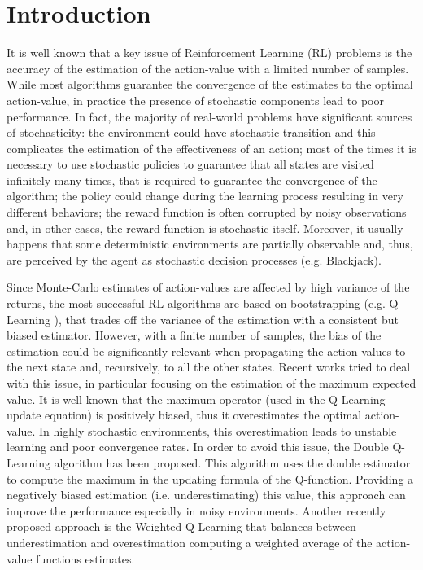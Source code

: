 \documentclass[conference]{IEEEtran}
\begin{document}
\section{Introduction}
It is well known that a key issue of Reinforcement Learning (RL) problems is the accuracy of the estimation of the action-value with a limited number of samples. While most algorithms guarantee the convergence of the estimates to the optimal action-value, in practice the presence of stochastic components lead to poor performance. In fact, the majority of real-world problems have significant sources of stochasticity: the environment could have stochastic transition and this complicates the estimation of the effectiveness of an action; most of the times it is necessary to use stochastic policies to guarantee that all states are visited infinitely many times, that is required to guarantee the convergence of the algorithm; the policy could change during the learning process resulting in very different behaviors; the reward function is often corrupted by noisy observations and, in other cases, the reward function is stochastic itself. Moreover, it usually happens that some deterministic environments are partially observable and, thus, are perceived by the agent as stochastic decision processes (e.g. Blackjack).

Since Monte-Carlo estimates of action-values are affected by high variance of the returns, the most successful RL algorithms are based on bootstrapping (e.g. Q-Learning \cite{watkins1992q}), that trades off the variance of the estimation with a consistent but biased estimator. However, with a finite number of samples, the bias of the estimation could be significantly relevant when propagating the action-values to the next state and, recursively, to all the other states. Recent works tried to deal with this issue, in particular focusing on the estimation of the maximum expected value. 
It is well known \cite{smith2006optimizer, van2004rational} that the maximum operator (used in the Q-Learning update equation) is positively biased, thus it overestimates the optimal action-value. In highly stochastic environments, this overestimation leads to unstable learning and poor convergence rates. In order to avoid this issue, the Double Q-Learning algorithm \cite{van2010double} has been proposed. This algorithm uses the double estimator \cite{van2013estimating} to compute the maximum in the updating formula of the Q-function. Providing a negatively biased estimation (i.e. underestimating) this value, this approach can improve the performance especially in noisy environments.
Another recently proposed approach is the Weighted Q-Learning \cite{d2016estimating} that balances between underestimation and overestimation computing a weighted average of the action-value functions estimates.
\end{document}

